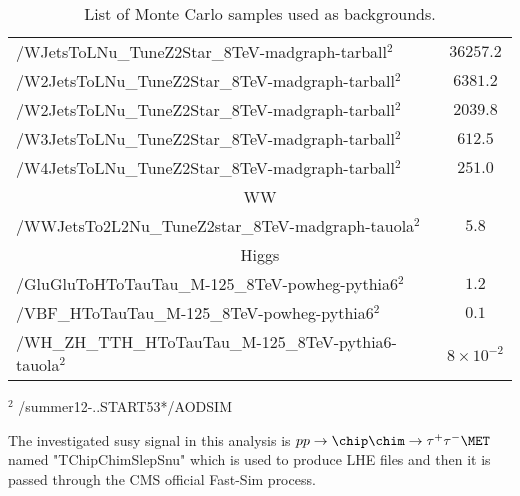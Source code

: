 \begin{table}[!ht]
\begin{center}
{\begin{tabular}{|l|c|}
/WJetsToLNu\_TuneZ2Star\_8TeV-madgraph-tarball$^{2}$          &  $36257.2$              \\
/W2JetsToLNu\_TuneZ2Star\_8TeV-madgraph-tarball$^{2}$         &  $6381.2$               \\
/W2JetsToLNu\_TuneZ2Star\_8TeV-madgraph-tarball$^{2}$         &  $2039.8$               \\
/W3JetsToLNu\_TuneZ2Star\_8TeV-madgraph-tarball$^{2}$         &  $612.5$               \\
/W4JetsToLNu\_TuneZ2Star\_8TeV-madgraph-tarball$^{2}$         &  $251.0$                \\
\hline
\multicolumn{2}{|c|}{WW}\\
\hline
/WWJetsTo2L2Nu\_TuneZ2star\_8TeV-madgraph-tauola$^{2}$        &  $5.8$                \\

\hline
\multicolumn{2}{|c|}{Higgs}\\
\hline
/GluGluToHToTauTau\_M-125\_8TeV-powheg-pythia6$^{2}$          &  $1.2$                \\
/VBF\_HToTauTau\_M-125\_8TeV-powheg-pythia6$^{2}$             &  $0.1$                \\
/WH\_ZH\_TTH\_HToTauTau\_M-125\_8TeV-pythia6-tauola$^{2}$     &  $8\times10^{-2}$                \\

\hline

\end{tabular}
}
\end{center}
$^{2}$ /summer12-..START53*/AODSIM\\

\caption{ 
  List of Monte Carlo samples used as backgrounds.
}
\label{Tab.MCSamples}

\end{table}

The investigated susy signal in this analysis is $pp \rightarrow \chip \chim \rightarrow \tau^+ \tau^- \MET$ named "TChipChimSlepSnu" which \PYTHIA is used to produce LHE files and then it is passed through the CMS official Fast-Sim process.

